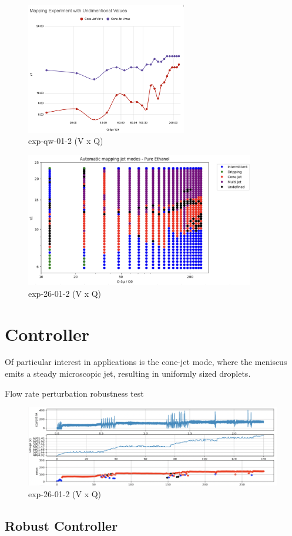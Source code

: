    \begin{multicols}{2}

        \begin{figure}[H]
            \center
            \includegraphics[width=7cm]{Figuras/april/manual_non_dim_exp.png}
            \caption{ exp-qw-01-2 (V x Q)}
        \end{figure}

        \begin{figure}[H]
            \center
            \includegraphics[width=10cm]{Figuras/19:03/non-dimensional-1.png}
            \caption{ exp-26-01-2 (V x Q)}
        \end{figure}


    \end{multicols}

\section{Controller}
\label{sec:controller_results}

    Of particular interest in applications is the cone-jet mode, where the meniscus emits a steady microscopic jet, resulting in uniformly sized droplets. 

        Flow rate perturbation robustness test

        \begin{figure}[H]
            \center
            \includegraphics[width=17cm]{Figuras/19:03/control_first_results.png}
            \caption{ exp-26-01-2 (V x Q)}
        \end{figure}


    \subsection{Robust Controller}

    



\clearpage